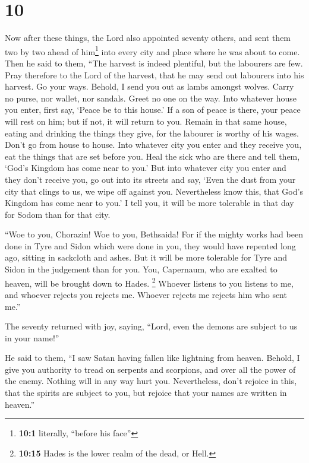 \hypertarget{section-9}{%
\section{10}\label{section-9}}

 Now after these things, the Lord also appointed seventy
others, and sent them two by two ahead of him\footnote{\textbf{10:1}
  literally, ``before his face''} into every city and place where he was
about to come.  Then he said to them, ``The harvest is
indeed plentiful, but the labourers are few. Pray therefore to the Lord
of the harvest, that he may send out labourers into his harvest.
 Go your ways. Behold, I send you out as lambs amongst
wolves.  Carry no purse, nor wallet, nor sandals. Greet no
one on the way.  Into whatever house you enter, first say,
`Peace be to this house.'  If a son of peace is there,
your peace will rest on him; but if not, it will return to you.
 Remain in that same house, eating and drinking the things
they give, for the labourer is worthy of his wages. Don't go from house
to house.  Into whatever city you enter and they receive
you, eat the things that are set before you.  Heal the
sick who are there and tell them, `God's Kingdom has come near to you.'
 But into whatever city you enter and they don't receive
you, go out into its streets and say,  `Even the dust
from your city that clings to us, we wipe off against you. Nevertheless
know this, that God's Kingdom has come near to you.'  I
tell you, it will be more tolerable in that day for Sodom than for that
city.

 ``Woe to you, Chorazin! Woe to you, Bethsaida! For if
the mighty works had been done in Tyre and Sidon which were done in you,
they would have repented long ago, sitting in sackcloth and ashes.
 But it will be more tolerable for Tyre and Sidon in the
judgement than for you.  You, Capernaum, who are exalted
to heaven, will be brought down to Hades. \footnote{\textbf{10:15} Hades
  is the lower realm of the dead, or Hell.}  Whoever
listens to you listens to me, and whoever rejects you rejects me.
Whoever rejects me rejects him who sent me.''

 The seventy returned with joy, saying, ``Lord, even the
demons are subject to us in your name!''

 He said to them, ``I saw Satan having fallen like
lightning from heaven.  Behold, I give you authority to
tread on serpents and scorpions, and over all the power of the enemy.
Nothing will in any way hurt you.  Nevertheless, don't
rejoice in this, that the spirits are subject to you, but rejoice that
your names are written in heaven.''

